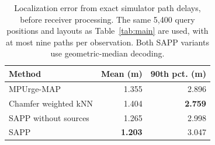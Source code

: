 \begin{table}[t]
\centering\small
\caption{Localization error from exact simulator path delays, before receiver processing. The same 5,400 query positions and layouts as Table~\ref{tab:main} are used, with at most nine paths per observation. Both SAPP variants use geometric-median decoding.}
\label{tab:raw}
\setlength{\tabcolsep}{7pt}
\begin{tabular}{lrr}
\toprule
Method & Mean (m) & 90th pct. (m)\\
\midrule
MPUrge-MAP & 1.355 & 2.896\\
Chamfer weighted kNN & 1.404 & \textbf{2.759}\\
SAPP without sources & 1.265 & 2.998\\
SAPP & \textbf{1.203} & 3.047\\
\bottomrule
\end{tabular}
\end{table}
